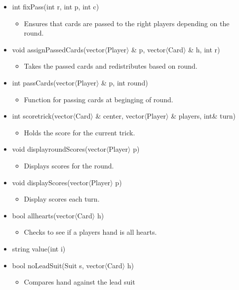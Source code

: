 \documentclass[]{scrartcl}
\begin{document}
\begin{itemize}
\begin{itemize}
 		\end{itemize}
 	\item int fixPass(int r, int p, int c)
 		\begin{itemize}
 			\item Ensures that cards are passed to the right players depending on the round.
 		\end{itemize}
 	\item void assignPassedCards(vector$\langle$Player$\rangle$ \& p, vector$\langle$Card$\rangle$ \& h, int r)
 		\begin{itemize}
 			\item Takes the passed cards and redistributes based on round.
 		\end{itemize}
 	\item int passCards(vector$\langle$Player$\rangle$ \& p, int round)
 		\begin{itemize}
 			\item Function for passing cards at beginging of round.
 		\end{itemize}
 	\item int scoretrick(vector$\langle$Card$\rangle$ \& center, vector$\langle$Player$\rangle$ \& players, int\& turn)
 		\begin{itemize}
 			\item 	Holds the score for the current trick.
 		\end{itemize}
 	\item void displayroundScores(vector$\langle$Player$\rangle$ p)
 		\begin{itemize}
 			\item Displays scores for the round.
 		\end{itemize}
 	\item void displayScores(vector$\langle$Player$\rangle$  p)
 		\begin{itemize}
 			\item Display scores each turn.
 		\end{itemize}
 	\item bool allhearts(vector$\langle$Card$\rangle$ h)
 		\begin{itemize}
 			\item Checks to see if a players hand is all hearts.
 		\end{itemize}
 	\item string value(int i)
 	\item bool noLeadSuit(Suit s, vector$\langle$Card$\rangle$ h)
 		\begin{itemize}
 			\item Compares hand against the lead suit

\end{itemize}
\end{itemize}
\end{document}
